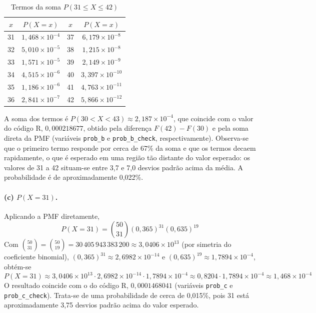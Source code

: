 \documentclass[10pt,a4paper]{article}
\begin{document}
\begin{table}[H]
\centering
\caption{Termos da soma $P(31 \le X \le 42)$}
\label{tab:q1-termos}
\begin{tabular}{cc|cc}
\hline
$x$ & $P(X = x)$ & $x$ & $P(X = x)$ \\
\hline
31 & $1{,}468 \times 10^{-4}$ & 37 & $6{,}179 \times 10^{-8}$ \\
32 & $5{,}010 \times 10^{-5}$ & 38 & $1{,}215 \times 10^{-8}$ \\
33 & $1{,}571 \times 10^{-5}$ & 39 & $2{,}149 \times 10^{-9}$ \\
34 & $4{,}515 \times 10^{-6}$ & 40 & $3{,}397 \times 10^{-10}$ \\
35 & $1{,}186 \times 10^{-6}$ & 41 & $4{,}763 \times 10^{-11}$ \\
36 & $2{,}841 \times 10^{-7}$ & 42 & $5{,}866 \times 10^{-12}$ \\
\hline
\end{tabular}
\end{table}

A soma dos termos é $P(30 < X < 43) \approx 2{,}187 \times 10^{-4}$, que coincide com o valor do código R, $0{,}000218677$, obtido pela diferença $F(42) - F(30)$ e pela soma direta da PMF (variáveis \texttt{prob\_b} e \texttt{prob\_b\_check}, respectivamente). Observa-se que o primeiro termo responde por cerca de 67\% da soma e que os termos decaem rapidamente, o que é esperado em uma região tão distante do valor esperado: os valores de 31 a 42 situam-se entre 3,7 e 7,0 desvios padrão acima da média. A probabilidade é de aproximadamente 0,022\%.

\paragraph{(c) $P(X = 31)$.} Aplicando a PMF diretamente,
\[
P(X = 31) = \binom{50}{31}(0{,}365)^{31}(0{,}635)^{19}
\]
Com $\binom{50}{31} = \binom{50}{19} = 30\,405\,943\,383\,200 \approx 3{,}0406 \times 10^{13}$ (por simetria do coeficiente binomial), $(0{,}365)^{31} \approx 2{,}6982 \times 10^{-14}$ e $(0{,}635)^{19} \approx 1{,}7894 \times 10^{-4}$, obtém-se
\[
P(X = 31) \approx 3{,}0406 \times 10^{13} \cdot 2{,}6982 \times 10^{-14} \cdot 1{,}7894 \times 10^{-4} \approx 0{,}8204 \cdot 1{,}7894 \times 10^{-4} \approx 1{,}468 \times 10^{-4}
\]
O resultado coincide com o do código R, $0{,}0001468041$ (variáveis \texttt{prob\_c} e \texttt{prob\_c\_check}). Trata-se de uma probabilidade de cerca de 0,015\%, pois 31 está aproximadamente 3,75 desvios padrão acima do valor esperado.
\end{document}
